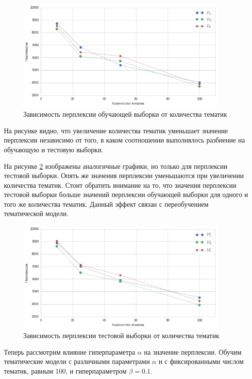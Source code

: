 \documentclass[a4paper]{report}
\begin{document}
	\begin{figure}[h]
		
		\centering
		\includegraphics[width=400px]
		{imgs/PerplexityTopicsOnTrain.png}
		\caption{Зависимость перплексии обучающей выборки от количества тематик}
		\label{fig:PerpTopicsOnTrain}
	\end{figure}
	
	 На рисунке видно, что увеличение количества тематик уменьшает значение перплексии независимо от того, в каком соотношении выполнялось разбиение на обучающую и тестовую выборки.
	
	 На рисунке \ref{fig:PerpTopicsOnTest} изображены аналогичные графики, но только для перплексии тестовой выборки. Опять же значения перплексии уменьшаются при увеличении количества тематик. Стоит обратить внимание на то, что значения перплексии тестовой выборки больше значений перплексии обучающей выборки для одного и того же количества тематик. Данный эффект связан с переобучением тематической модели.
	 
	 \begin{figure}[h]
		\centering
		\includegraphics[width=400px]
		{imgs/PerplexityTopicsOnTest.png}
		\caption{Зависимость перплексии тестовой выборки от количества тематик}
		\label{fig:PerpTopicsOnTest}
	\end{figure}
	 
	 
	 
	 Теперь рассмотрим влияние гиперпараметра $\alpha$ на значение перплексии. Обучим тематические модели с различными параметрами $\alpha$ и с фиксированными числом тематик, равным 100, и гиперпараметром $\beta=0.1$. 
	 
\end{document}
